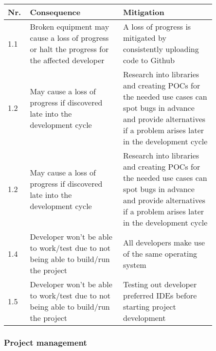 \documentclass{article} %
\begin{document}
\begin{center}
    \begin{tabular}{| p{0.05\linewidth} | p{0.4\linewidth} | p{0.4\linewidth} |}
        \hline
        Nr. & Consequence                                                                                   & Mitigation                                                                                                                                                              \\ [0.5ex]
        \hline\hline
        1.1 & Broken equipment may cause a loss of progress or halt the progress for the affected developer & A loss of progress is mitigated by consistently uploading code to Github                                                                                                \\
        \hline
        1.2 & May cause a loss of progress if discovered late into the development cycle                    & Research into libraries and creating POCs for the needed use cases can spot bugs in advance and provide alternatives if a problem arises later in the development cycle \\
        \hline
        1.2 & May cause a loss of progress if discovered late into the development cycle                    & Research into libraries and creating POCs for the needed use cases can spot bugs in advance and provide alternatives if a problem arises later in the development cycle \\
        \hline
        1.4 & Developer won't be able to work/test due to not being able to build/run the project           & All developers make use of the same operating system                                                                                                                    \\
        \hline
        1.5 & Developer won't be able to work/test due to not being able to build/run the project           & Testing out developer preferred IDEs before starting project development                                                                                                \\ [1ex]
        \hline
    \end{tabular}
\end{center}

\subsubsection{Project management}
\end{document}
